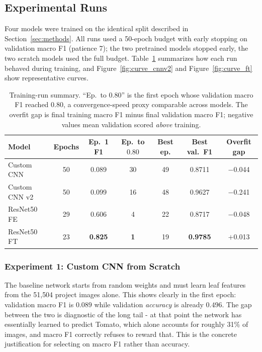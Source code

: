 \documentclass[12pt,a4paper]{article}
\begin{document}
\subsection{Experimental Runs}
Four models were trained on the identical split described in Section~\ref{sec:methods}. All runs used a 50-epoch budget with early stopping on validation macro F1 (patience 7); the two pretrained models stopped early, the two scratch models used the full budget. Table~\ref{tab:runsummary} summarizes how each run behaved during training, and Figure~\ref{fig:curve_cnnv2} and Figure~\ref{fig:curve_ft} show representative curves.

\begin{table}[H]
    \centering
    \caption{Training-run summary. ``Ep.\ to $0.80$'' is the first epoch whose validation macro F1 reached $0.80$, a convergence-speed proxy comparable across models. The overfit gap is final training macro F1 minus final validation macro F1; negative values mean validation scored \emph{above} training.}
    \label{tab:runsummary}
    \begin{tabular}{lcccccc}
        \toprule
        Model & Epochs & Ep.\ 1 F1 & Ep.\ to $0.80$ & Best ep. & Best val.\ F1 & Overfit gap \\
        \midrule
        Custom CNN & 50 & 0.089 & 30 & 49 & 0.8711 & $-$0.044 \\
        Custom CNN v2 & 50 & 0.099 & 16 & 48 & 0.9627 & $-$0.241 \\
        ResNet50 FE & 29 & 0.606 & 4 & 22 & 0.8717 & $-$0.048 \\
        ResNet50 FT & 23 & \textbf{0.825} & \textbf{1} & 19 & \textbf{0.9785} & $+$0.013 \\
        \bottomrule
    \end{tabular}
\end{table}

\subsubsection{Experiment 1: Custom CNN from Scratch}
The baseline network starts from random weights and must learn leaf features from the 51{,}504 project images alone. This shows clearly in the first epoch: validation macro F1 is $0.089$ while validation \emph{accuracy} is already $0.496$. The gap between the two is diagnostic of the long tail - at that point the network has essentially learned to predict Tomato, which alone accounts for roughly 31\% of images, and macro F1 correctly refuses to reward that. This is the concrete justification for selecting on macro F1 rather than accuracy.
\end{document}

